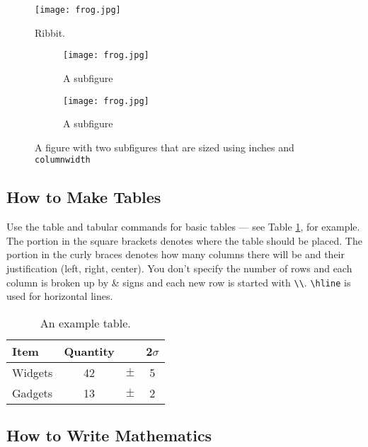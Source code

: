 \begin{figure}[h] 
	\centering
	\texttt{[image: frog.jpg]} %
	\caption{Ribbit.}
	\label{fig:frog}
\end{figure}

\begin{figure}[h!]
\centering
\begin{subfigure}{.5\columnwidth}
  \centering
  \texttt{[image: frog.jpg]} 
  \caption{A subfigure}
  \label{fig:sub1}
\end{subfigure}%
\begin{subfigure}{.5\columnwidth}
  \centering
  \texttt{[image: frog.jpg]}
  \caption{A subfigure}
  \label{fig:sub2}
\end{subfigure}
\caption{A figure with two subfigures that are sized using inches and \texttt{columnwidth}}
\label{fig:sidebyside}
\end{figure}


\subsection{How to Make Tables}

Use the table and tabular commands for basic tables --- see Table \ref{tab:widgets}, for example. The portion in the square brackets denotes where the table should be placed. The portion in the curly braces denotes how many columns there will be and their justification (left, right, center). You don't specify the number of rows and each column is broken up by \& signs and each new row is started with \verb!\\!. \verb!\hline! is used for horizontal lines. 

\begin{table}
	\centering
	\begin{tabular}[h]{l | c c c}
		Item & Quantity & & 2$\sigma$
		\\ \hline
		Widgets & 42 & $\pm$ & 5\\
		Gadgets & 13 & $\pm$ & 2
	\end{tabular}
	\caption{An example table.}
    \label{tab:widgets}
\end{table}

\subsection{How to Write Mathematics}

